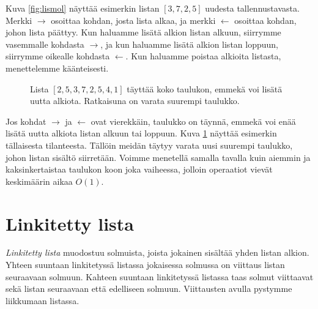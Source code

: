 Kuva \ref{fig:lismol} näyttää esimerkin listan $[3,7,2,5]$
uudesta tallennustavasta.
Merkki $\rightarrow$ osoittaa kohdan, josta lista alkaa,
ja merkki $\leftarrow$ osoittaa kohdan, johon lista päättyy.
Kun haluamme lisätä alkion listan alkuun,
siirrymme vasemmalle kohdasta $\rightarrow$,
ja kun haluamme lisätä alkion listan loppuun,
siirrymme oikealle kohdasta $\leftarrow$.
Kun haluamme poistaa alkioita listasta,
menettelemme käänteisesti.

\begin{figure}
\center
{}
\caption{Lista $[2,5,3,7,2,5,4,1]$ täyttää koko taulukon, emmekä voi lisätä uutta alkiota.
Ratkaisuna on varata suurempi taulukko.}
\label{fig:lismol2}
\end{figure}

Jos kohdat $\rightarrow$ ja $\leftarrow$ ovat vierekkäin,
taulukko on täynnä, emmekä voi enää lisätä uutta alkiota
listan alkuun tai loppuun.
Kuva \ref{fig:lismol2} näyttää esimerkin tällaisesta tilanteesta.
Tällöin meidän täytyy varata uusi suurempi taulukko,
johon listan sisältö siirretään.
Voimme menetellä samalla tavalla kuin aiemmin ja
kaksinkertaistaa taulukon koon joka vaiheessa,
jolloin operaatiot vievät keskimäärin aikaa $O(1)$.

\section{Linkitetty lista}

\emph{Linkitetty lista} muodostuu solmuista, joista jokainen sisältää
yhden listan alkion.
Yhteen suuntaan linkitetyssä listassa jokaisessa
solmussa on viittaus listan seuraavaan solmuun.
Kahteen suuntaan linkitetyssä listassa taas
solmut viittaavat sekä listan seuraavaan että edelliseen solmuun.
Viittausten avulla pystymme liikkumaan listassa.

